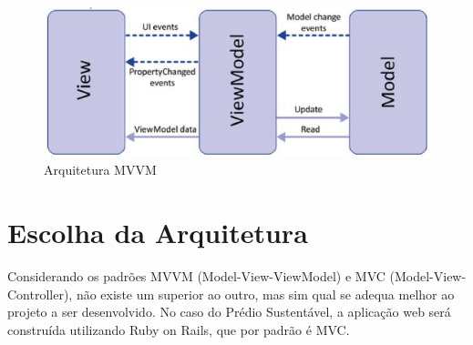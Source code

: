 \begin{figure}[!h]
  \centering
  \includegraphics[keepaspectratio=true,scale=0.6]{figuras/MVVM.eps}
  \caption{Arquitetura MVVM}
  \label{fig:mvvm}
\end{figure}

\section{Escolha da Arquitetura}

Considerando os padrões MVVM (Model-View-ViewModel) e MVC (Model-View-Controller), não existe um superior ao outro, mas sim qual se adequa melhor ao projeto a ser desenvolvido. No caso do Prédio Sustentável, a aplicação web será construída utilizando Ruby on Rails, que por padrão é MVC.
